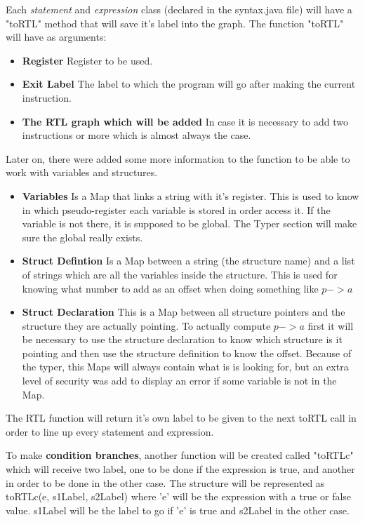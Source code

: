 \documentclass[conference]{IEEEtran}
\theoremstyle{definition}
\begin{document}
Each \textit{statement} and \textit{expression} class (declared in the syntax.java file) will have a "toRTL" method that will save it's label into the graph. The function "toRTL" will have as arguments:
\begin{itemize}
	\item \textbf{Register} Register to be used.
	\item \textbf{Exit Label} The label to which the program will go after making the current instruction.
	\item \textbf{The RTL graph which will be added} In case it is necessary to add two instructions or more which is almost always the case.
\end{itemize}
Later on, there were added some more information to the function to be able to work with variables and structures.
\begin{itemize}
	\item \textbf{Variables} Is a Map that links a string with it's register. This is used to know in which pseudo-register each variable is stored in order access it. If the variable is not there, it is supposed to be global. The Typer section will make sure the global really exists.
	\item \textbf{Struct Defintion} Is a Map between a string (the structure name) and a list of strings which are all the variables inside the structure. This is used for knowing what number to add as an offset when doing something like $p->a$
	\item \textbf{Struct Declaration} This is a Map between all structure pointers and the structure they are actually pointing. To actually compute $p->a$ first it will be necessary to use the structure declaration to know which structure is it pointing and then use the structure definition to know the offset. Because of the typer, this Maps will always contain what is is looking for, but an extra level of security was add to display an error if some variable is not in the Map.
\end{itemize}
The RTL function will return it's own label to be given to the next toRTL call in order to line up every statement and expression.

To make \textbf{condition branches}, another function will be created called "toRTLc" which will receive two label, one to be done if the expression is true, and another in order to be done in the other case. The structure will be represented as toRTLc(e, s1Label, s2Label) where 'e' will be the expression with a true or false value. s1Label will be the label to go if 'e' is true and s2Label in the other case.
\end{document}
